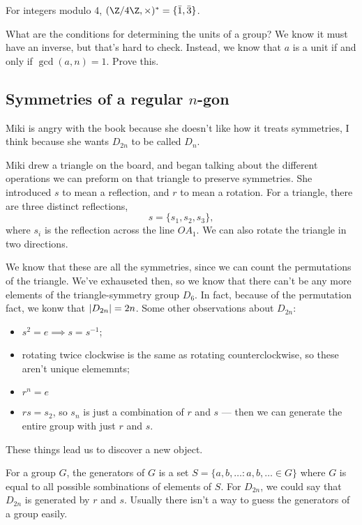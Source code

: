 \begin{example}
For integers modulo 4, $(\Z/4\Z, \times)^* = \{\bar{1}, \bar{3}\}$.
\end{example}

\begin{problem}[On Homework]
What are the conditions for determining the units of a group? We know it must have an inverse, but that's hard to check. Instead, we know that $a$ is a unit if and only if $\gcd(a,n) = 1$. Prove this.
\end{problem}

\subsection*{Symmetries of a regular $n$-gon}
Miki is angry with the book because she doesn't like how it treats symmetries, I think because she wants $D_{2n}$ to be called $D_n$.

Miki drew a triangle on the board, and began talking about the different operations we can preform on that triangle to preserve symmetries. She introduced $s$ to mean a reflection, and $r$ to mean a rotation. For a triangle, there are three distinct reflections,
\[ s = \{s_1, s_2, s_3 \}, \]
where $s_i$ is the reflection across the line $OA_1$. We can also rotate the triangle in two directions.

We know that these are all the symmetries, since we can count the permutations of the triangle. We've exhauseted then, so we know that there can't be any more elements of the triangle-symmetry group $D_6$. In fact, because of the permutation fact, we konw that $\abs{D_{2n}} = 2n$. Some other observations about $D_{2n}$:
\begin{itemize}
\item $s^2 = e \implies s = s^{-1}$;
\item rotating twice clockwise is the same as rotating counterclockwise, so these aren't unique elememnts;
\item $r^n = e$
\item $rs = s_2$, so $s_n$ is just a combination of $r$ and $s$ --- then we can generate the entire group with just $r$ and $s$.
\end{itemize}
These things lead us to discover a new object.

\begin{definition}[Generators]
For a group $G$, the generators of $G$ is a set $ S = \{a,b,\dotsc : a,b,\dotsc \in G\}$ where $G$ is equal to all possible sombinations of elements of $S$. For $D_{2n}$, we could say that $D_{2n}$ is generated by $r$ and $s$.
Usually there isn't a way to guess the generators of a group easily.
\end{definition}

